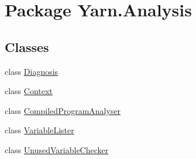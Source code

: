 \hypertarget{a00345}{\section{Package Yarn.\-Analysis}
\label{a00345}
}
\subsection*{Classes}
\begin{DoxyCompactItemize}
\item 
class \hyperlink{a00089}{Diagnosis}
\item 
class \hyperlink{a00056}{Context}
\item 
class \hyperlink{a00052}{Compiled\-Program\-Analyser}
\item 
class \hyperlink{a00168}{Variable\-Lister}
\item 
class \hyperlink{a00165}{Unused\-Variable\-Checker}
\end{DoxyCompactItemize}
